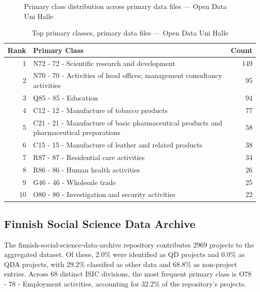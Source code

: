 \clearpage

\begin{figure}[H]
    \centering
    
    \caption{Primary class distribution across primary data files --- Open Data Uni Halle}
\end{figure}

\begin{table}[H]
    \centering
    \begin{tabular}{r p{10cm} r}
    \hline
    \textbf{Rank} & \textbf{Primary Class} & \textbf{Count} \\
    \hline
    1 & N72 - 72 - Scientific research and development & 149 \\
    2 & N70 - 70 - Activities of head offices; management consultancy activities & 95 \\
    3 & Q85 - 85 - Education & 94 \\
    4 & C12 - 12 - Manufacture of tobacco products & 77 \\
    5 & C21 - 21 - Manufacture of basic pharmaceutical products and pharmaceutical preparations & 58 \\
    6 & C15 - 15 - Manufacture of leather and related products & 38 \\
    7 & R87 - 87 - Residential care activities & 34 \\
    8 & R86 - 86 - Human health activities & 26 \\
    9 & G46 - 46 - Wholesale trade & 25 \\
    10 & O80 - 80 - Investigation and security activities & 22 \\
    \hline
    \end{tabular}
    \caption{Top primary classes, primary data files --- Open Data Uni Halle}
\end{table}

\clearpage

\subsection{Finnish Social Science Data Archive}


The finnish-social-science-data-archive repository contributes 2969 projects to the aggregated dataset. Of these, 2.0\% were identified as QD projects and 0.0\% as QDA projects, with 29.2\% classified as other data and 68.8\% as non-project entries. Across 68 distinct ISIC divisions, the most frequent primary class is O78 - 78 - Employment activities, accounting for 32.2\% of the repository's projects.


